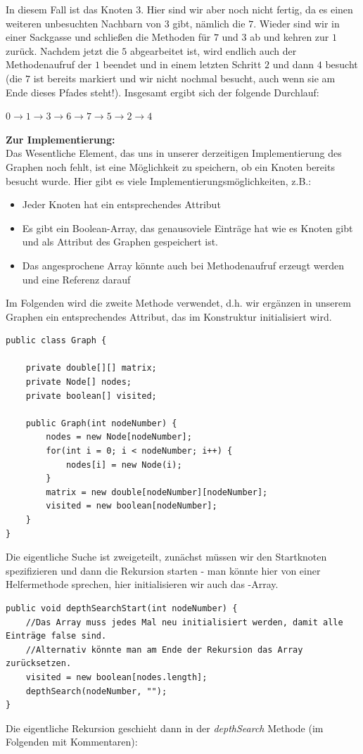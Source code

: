 \documentclass{article}
\begin{document}
In diesem Fall ist das Knoten $3$. Hier sind wir aber noch nicht fertig, da es einen weiteren unbesuchten Nachbarn von $3$ gibt, nämlich die $7$. Wieder sind wir in einer Sackgasse und schließen die Methoden für $7$ und $3$ ab und kehren zur $1$ zurück. Nachdem jetzt die $5$ abgearbeitet ist, wird endlich auch der Methodenaufruf der $1$ beendet und in einem letzten Schritt $2$ und dann $4$ besucht (die $7$ ist bereits markiert und wir nicht nochmal besucht, auch wenn sie am Ende dieses Pfades steht!). Insgesamt ergibt sich der folgende Durchlauf:
\begin{center}
    $0 \rightarrow 1 \rightarrow 3 \rightarrow 6 \rightarrow 7 \rightarrow 5 \rightarrow  2 \rightarrow 4$
\end{center}
\textbf{Zur Implementierung:} \\
Das Wesentliche Element, das uns in unserer derzeitigen Implementierung des Graphen noch fehlt, ist eine Möglichkeit zu speichern, ob ein Knoten bereits besucht wurde. Hier gibt es viele Implementierungsmöglichkeiten, z.B.:
\begin{itemize}
    \item Jeder Knoten hat ein entsprechendes Attribut
    \item Es gibt ein Boolean-Array, das genausoviele Einträge hat wie es Knoten gibt und als Attribut des Graphen gespeichert ist.
    \item Das angesprochene Array könnte auch bei Methodenaufruf erzeugt werden und eine Referenz darauf 
\end{itemize}
Im Folgenden wird die zweite Methode verwendet, d.h. wir ergänzen in unserem Graphen ein entsprechendes Attribut, das im Konstruktur initialisiert wird.
\begin{verbatim}
public class Graph {

    private double[][] matrix;
    private Node[] nodes;
    private boolean[] visited;

    public Graph(int nodeNumber) {
        nodes = new Node[nodeNumber];
        for(int i = 0; i < nodeNumber; i++) {
            nodes[i] = new Node(i);
        }
        matrix = new double[nodeNumber][nodeNumber];
        visited = new boolean[nodeNumber];
    }
}
\end{verbatim}
Die eigentliche Suche ist zweigeteilt, zunächst müssen wir den Startknoten spezifizieren und dann die Rekursion starten - man könnte hier von einer Helfermethode sprechen, hier initialisieren wir auch das -Array.
\begin{verbatim}
public void depthSearchStart(int nodeNumber) {
    //Das Array muss jedes Mal neu initialisiert werden, damit alle Einträge false sind.
    //Alternativ könnte man am Ende der Rekursion das Array zurücksetzen. 
    visited = new boolean[nodes.length];
    depthSearch(nodeNumber, "");
}
\end{verbatim}
Die eigentliche Rekursion geschieht dann in der \textit{depthSearch} Methode (im Folgenden mit Kommentaren):
\end{document}
